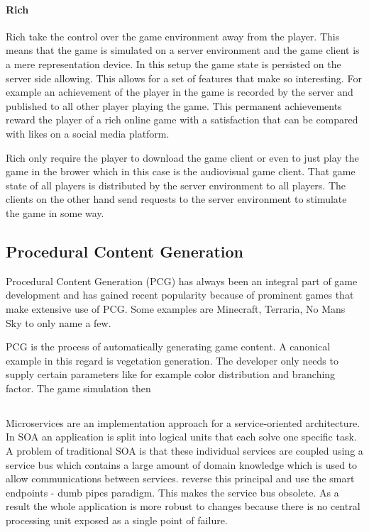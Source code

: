 \paragraph{Rich \ogs{}}

Rich \ogs{} take the control over the game environment away from the
player. This means that the game is simulated on a server environment and the
game client is a mere representation device. In this setup the game state is
persisted on the server side allowing. This allows for a set of features that
make \ogs{} so interesting. For example an achievement of the player in the game
is recorded by the server and published to all other player playing the game.
This permanent achievements reward the player of a rich online game with a
satisfaction that can be compared with likes on a social media platform. 

Rich \ogs{} only require the player to download the game client or even to just
play the game in the brower which in this case is the audiovisual game client.
That game state of all players is distributed by the server environment to all
players. The clients on the other hand send requests to the server environment
to stimulate the game in some way.

\subsection{Procedural Content Generation}

Procedural Content Generation (PCG) has always been an integral part of game
development and has gained recent popularity because of prominent games that
make extensive use of PCG. Some examples are Minecraft, Terraria, No Mans Sky to
only name a few.

PCG is the process of automatically generating game content. A canonical
example in this regard is vegetation generation. The developer only needs to
supply certain parameters like for example color distribution and branching
factor. The game simulation then 

\subsection{\mss{}}

Microservices are an implementation approach for a service-oriented
architecture. In SOA an application is split into logical units
that each solve one specific task. A problem of traditional SOA is that these
individual services are coupled using a service bus which contains a large
amount of domain knowledge which is used to allow communications between
services. \mss{} reverse this principal and use the smart endpoints - dumb pipes
paradigm. This makes the service bus obsolete. As a result the whole
application is more robust to changes because there is no central processing
unit exposed as a single point of failure.

